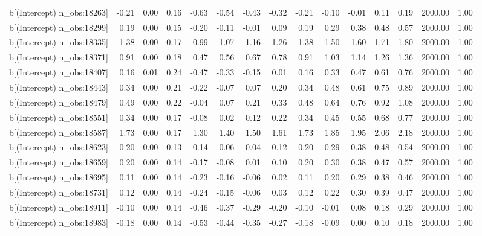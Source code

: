 \begin{table}[ht]
\begin{tabular}{rrrrrrrrrrrrrrr}
  b[(Intercept) n\_obs:18263] & -0.21 & 0.00 & 0.16 & -0.63 & -0.54 & -0.43 & -0.32 & -0.21 & -0.10 & -0.01 & 0.11 & 0.19 & 2000.00 & 1.00 \\ 
  b[(Intercept) n\_obs:18299] & 0.19 & 0.00 & 0.15 & -0.20 & -0.11 & -0.01 & 0.09 & 0.19 & 0.29 & 0.38 & 0.48 & 0.57 & 2000.00 & 1.00 \\ 
  b[(Intercept) n\_obs:18335] & 1.38 & 0.00 & 0.17 & 0.99 & 1.07 & 1.16 & 1.26 & 1.38 & 1.50 & 1.60 & 1.71 & 1.80 & 2000.00 & 1.00 \\ 
  b[(Intercept) n\_obs:18371] & 0.91 & 0.00 & 0.18 & 0.47 & 0.56 & 0.67 & 0.78 & 0.91 & 1.03 & 1.14 & 1.26 & 1.36 & 2000.00 & 1.00 \\ 
  b[(Intercept) n\_obs:18407] & 0.16 & 0.01 & 0.24 & -0.47 & -0.33 & -0.15 & 0.01 & 0.16 & 0.33 & 0.47 & 0.61 & 0.76 & 2000.00 & 1.00 \\ 
  b[(Intercept) n\_obs:18443] & 0.34 & 0.00 & 0.21 & -0.22 & -0.07 & 0.07 & 0.20 & 0.34 & 0.48 & 0.61 & 0.75 & 0.89 & 2000.00 & 1.00 \\ 
  b[(Intercept) n\_obs:18479] & 0.49 & 0.00 & 0.22 & -0.04 & 0.07 & 0.21 & 0.33 & 0.48 & 0.64 & 0.76 & 0.92 & 1.08 & 2000.00 & 1.00 \\ 
  b[(Intercept) n\_obs:18551] & 0.34 & 0.00 & 0.17 & -0.08 & 0.02 & 0.12 & 0.22 & 0.34 & 0.45 & 0.55 & 0.68 & 0.77 & 2000.00 & 1.00 \\ 
  b[(Intercept) n\_obs:18587] & 1.73 & 0.00 & 0.17 & 1.30 & 1.40 & 1.50 & 1.61 & 1.73 & 1.85 & 1.95 & 2.06 & 2.18 & 2000.00 & 1.00 \\ 
  b[(Intercept) n\_obs:18623] & 0.20 & 0.00 & 0.13 & -0.14 & -0.06 & 0.04 & 0.12 & 0.20 & 0.29 & 0.38 & 0.48 & 0.54 & 2000.00 & 1.00 \\ 
  b[(Intercept) n\_obs:18659] & 0.20 & 0.00 & 0.14 & -0.17 & -0.08 & 0.01 & 0.10 & 0.20 & 0.30 & 0.38 & 0.47 & 0.57 & 2000.00 & 1.00 \\ 
  b[(Intercept) n\_obs:18695] & 0.11 & 0.00 & 0.14 & -0.23 & -0.16 & -0.06 & 0.02 & 0.11 & 0.20 & 0.29 & 0.38 & 0.46 & 2000.00 & 1.00 \\ 
  b[(Intercept) n\_obs:18731] & 0.12 & 0.00 & 0.14 & -0.24 & -0.15 & -0.06 & 0.03 & 0.12 & 0.22 & 0.30 & 0.39 & 0.47 & 2000.00 & 1.00 \\ 
  b[(Intercept) n\_obs:18911] & -0.10 & 0.00 & 0.14 & -0.46 & -0.37 & -0.29 & -0.20 & -0.10 & -0.01 & 0.08 & 0.18 & 0.29 & 2000.00 & 1.00 \\ 
  b[(Intercept) n\_obs:18983] & -0.18 & 0.00 & 0.14 & -0.53 & -0.44 & -0.35 & -0.27 & -0.18 & -0.09 & 0.00 & 0.10 & 0.18 & 2000.00 & 1.00 \\ 

\end{tabular}
\end{table}

